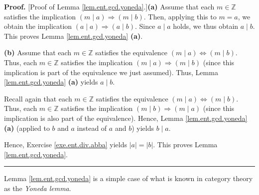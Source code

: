 \documentclass[numbers=enddot,12pt,final,onecolumn,notitlepage]{scrartcl}%
\numberwithin{exer}{subsection}
\theoremstyle{definition}
\newenvironment{proof}[1][Proof]{\noindent\textbf{#1.} }{\ \rule{0.5em}{0.5em}}
\begin{document}
\begin{proof}
[Proof of Lemma \ref{lem.ent.gcd.yoneda}.]\textbf{(a)} Assume that each
$m\in\mathbb{Z}$ satisfies the implication $\left(  m\mid a\right)
\Longrightarrow\left(  m\mid b\right)  $. Then, applying this to $m=a$, we
obtain the implication $\left(  a\mid a\right)  \Longrightarrow\left(  a\mid
b\right)  $. Since $a\mid a$ holds, we thus obtain $a\mid b$. This proves
Lemma \ref{lem.ent.gcd.yoneda} \textbf{(a)}.

\textbf{(b)} Assume that each $m\in\mathbb{Z}$ satisfies the equivalence
$\left(  m\mid a\right)  \Longleftrightarrow\left(  m\mid b\right)  $. Thus,
each $m\in\mathbb{Z}$ satisfies the implication $\left(  m\mid a\right)
\Longrightarrow\left(  m\mid b\right)  $ (since this implication is part of
the equivalence we just assumed). Thus, Lemma \ref{lem.ent.gcd.yoneda}
\textbf{(a)} yields $a\mid b$.

Recall again that each $m\in\mathbb{Z}$ satisfies the equivalence $\left(
m\mid a\right)  \Longleftrightarrow\left(  m\mid b\right)  $. Thus, each
$m\in\mathbb{Z}$ satisfies the implication $\left(  m\mid b\right)
\Longrightarrow\left(  m\mid a\right)  $ (since this implication is also part
of the equivalence). Hence, Lemma \ref{lem.ent.gcd.yoneda} \textbf{(a)}
(applied to $b$ and $a$ instead of $a$ and $b$) yields $b\mid a$.

Hence, Exercise \ref{exe.ent.div.abba} yields $\left\vert a\right\vert
=\left\vert b\right\vert $. This proves Lemma \ref{lem.ent.gcd.yoneda}.
\end{proof}

Lemma \ref{lem.ent.gcd.yoneda} is a simple case of what is known in category
theory as the \textit{Yoneda lemma}.
\end{document}
